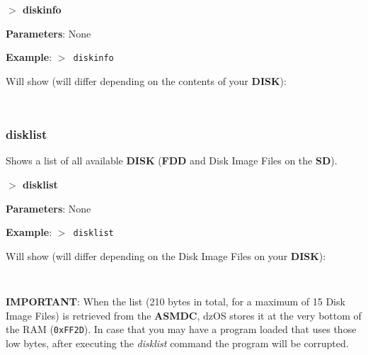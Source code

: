         \hspace{1.9cm}\textbf{$>$ diskinfo}

        \textbf{Parameters}: None

        \textbf{Example}: \texttt{$>$ diskinfo}

        Will show (will differ depending on the contents of your \textbf{DISK}):

        \texttt{
        }

        \subsubsection{{disklist}}
        Shows a list of all available \textbf{DISK} (\textbf{FDD} and Disk Image
        Files on the \textbf{SD}).

        \hspace{1.9cm}\textbf{$>$ disklist}

        \textbf{Parameters}: None

        \textbf{Example}: \texttt{$>$ disklist}

        Will show (will differ depending on the Disk Image Files on your
        \textbf{DISK}):

        \texttt{
        }

        \hfill\break

        \textbf{IMPORTANT}: When the list (210 bytes in total, for a maximum of
        15 Disk Image Files) is retrieved from the \textbf{ASMDC}, dzOS stores
        it at the very bottom of the RAM (\texttt{0xFF2D}). In case that you may
        have a program loaded that uses those low bytes, after executing the
        \textit{disklist} command the program will be corrupted.
